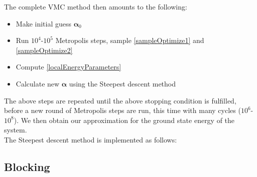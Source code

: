 \documentclass[english, a4paper]{article}
\begin{document}
\noindent The complete VMC method then amounts to the following:
\begin{itemize}
 \item Make initial guess $\boldsymbol{\alpha}_0$
 \item Run $10^4$-$10^5$ Metropolis steps, sample \eqref{sampleOptimize1} and \eqref{sampleOptimize2}
 \item Compute \eqref{localEnergyParameters} 
 \item Calculate new $\boldsymbol{\alpha}$ using the Steepest descent method
\end{itemize}
The above steps are repeated until the above stopping condition is fulfilled, before a new round of
Metropolis steps are run, this time with many cycles ($10^6$-$10^8$). We then obtain our approximation
for the ground state energy of the system.\\

\noindent The Steepest descent method is implemented as follows:


\subsection{Blocking}
\end{document}
